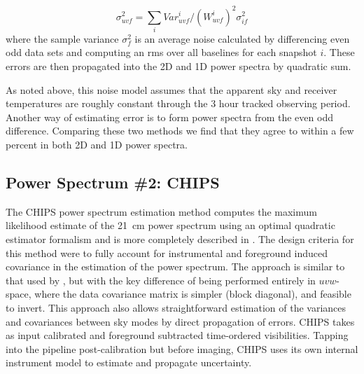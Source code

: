 \documentclass[twolcolumn,iop]{emulateapj}
\def\chipscite{\cite{2016arXiv160102073T}}
\begin{document}
\begin{equation}
\sigma^2_{uvf} = \sum_i Var^i_{uvf}/(W^i_{uvf})^2  \sigma^2_{if}
\end{equation}
where the sample variance $\sigma^2_f$ is an average noise calculated by differencing even odd data sets and computing an rms over all baselines for each snapshot $i$. These errors are then propagated into the 2D and 1D power spectra by quadratic sum.

 As noted above, this noise model assumes that the apparent sky and receiver temperatures are roughly constant through the 3 hour tracked observing period. Another way of estimating error is to form power spectra from the even odd difference.  Comparing these two methods we find that they agree to within a few percent in both 2D and 1D power spectra.





\subsection{Power Spectrum \#2: CHIPS}
\label{sec:CHIPS}
The CHIPS power spectrum estimation method computes the maximum likelihood estimate of the 21~cm power spectrum using an optimal quadratic estimator formalism and is more completely described in \chipscite{}.  The design criteria for this method were to fully account for instrumental and foreground induced covariance in the estimation of the power spectrum.  The approach is similar to that used by \cite{Liu:2011p8763}, but with the key difference of being performed entirely in $uvw$-space, where the data covariance matrix is simpler (block diagonal), and feasible to invert. This approach also allows straightforward estimation of the variances and covariances between sky modes by direct propagation of errors. CHIPS takes as input calibrated and foreground subtracted time-ordered visibilities. Tapping into the pipeline post-calibration but before imaging, CHIPS uses its own internal instrument model to estimate and propagate uncertainty.	
\end{document}
